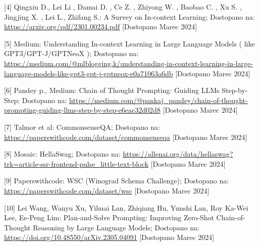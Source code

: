 \documentclass{article}
\begin{document}
[4] Qingxiu D., Lei Li , Damai D. , Ce Z. , Zhiyong W. , Baobao C. , Xu S. , Jingjing X. , Lei L.,  Zhifang S.: A Survey on In-context Learning;
Dostopano na: \url{https://arxiv.org/pdf/2301.00234.pdf} [Dostopano Marec 2024]\newline

[5] Medium: Understanding In-context Learning in Large Language Models ( like GPT3/GPT-J/GPTNeoX );
Dostopano na: \url{https://medium.com/@mlblogging.k/understanding-in-context-learning-in-large-language-models-like-gpt3-gpt-j-gptneox-e0a71063a6db} [Dostopano Marec 2024]\newline

[6] Pandey p.,  Medium: Chain of Thought Prompting: Guiding LLMs Step-by-Step;
Dostopano na: \url{https://medium.com/@pankaj_pandey/chain-of-thought-prompting-guiding-llms-step-by-step-e6eac32d02d8} [Dostopano Marec 2024]\newline

[7] Talmor et al: CommonsenseQA;
Dostopano na: \url{https://paperswithcode.com/dataset/commonsenseqa} [Dostopano Marec 2024]\newline

[8] Mosaic: HellaSwag;
Dostopano na: \url{ https://allenai.org/data/hellaswag?trk=article-ssr-frontend-pulse_little-text-block} [Dostopano Marec 2024]\newline

[9] Paperswithcode: WSC (Winograd Schema Challenge);
Dostopano na: \url{https://paperswithcode.com/dataset/wsc} [Dostopano Marec 2024]\newline

[10] Lei Wang, Wanyu Xu, Yihuai Lan, Zhiqiang Hu, Yunshi Lan, Roy Ka-Wei Lee, Ee-Peng Lim: Plan-and-Solve Prompting: Improving Zero-Shot Chain-of-Thought Reasoning by Large Language Models; 
Dostopano na: \url{https://doi.org/10.48550/arXiv.2305.04091} [Dostopano Marec 2024] \newline
\end{document}
